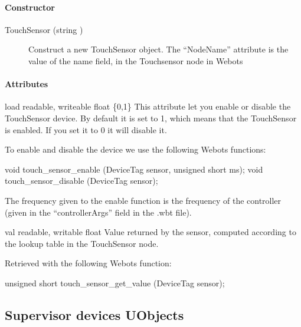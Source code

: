 \paragraph{Constructor}

\noindent
\begin{description}
\item[{TouchSensor (string )}] Construct a new
  TouchSensor object. The ``NodeName'' attribute is the value of the
  name field, in the Touchsensor node in Webots
\end{description}

\paragraph{Attributes}

\noindent
\begin{itemize}
\begin{attribute}{load}
  {readable, writeable}
  {float}
  {\{0,1\}}
  This attribute let you enable or disable the
  TouchSensor device.  By default it is set to 1, which means that the
  TouchSensor is enabled. If you set it to 0 it will disable it.

  To enable and disable the device we use the following Webots
  functions:
\begin{cxx}
void touch_sensor_enable (DeviceTag sensor, unsigned short ms);
void touch_sensor_disable (DeviceTag sensor);
\end{cxx}

The frequency given to the enable function is the frequency of the
\urbi controller (given in the ``controllerArgs'' field in the .wbt
file).
\end{attribute}

\begin{attribute}{val}
  {readable, writable}
  {float}
  {}
  Value returned by the sensor, computed according to the
  lookup table in the TouchSensor node.

  Retrieved with the following Webots function:
\begin{cxx}
unsigned short touch_sensor_get_value  (DeviceTag sensor);
\end{cxx}
\end{attribute}

\end{itemize}

\subsection{Supervisor devices UObjects}

